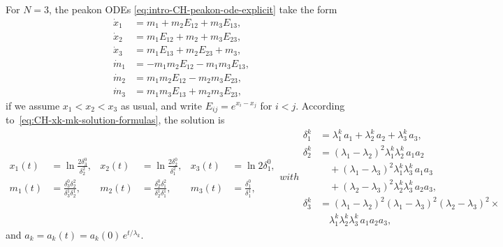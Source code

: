 \documentclass[10pt,a4paper]{article} \pdfoutput=1 
\begin{document}
\begin{example}
  \label{ex:CH-three-peakons}
  For $N=3$, the peakon ODEs \eqref{eq:intro-CH-peakon-ode-explicit} take the form
  \begin{equation}
    \begin{aligned}
      \dot x_1 &= m_1 + m_2 E_{12} + m_3 E_{13}
      , \\
      \dot x_2 &= m_1 E_{12} + m_2 + m_3 E_{23}
      , \\
      \dot x_3 &= m_1 E_{13} + m_2 E_{23} + m_3
      , \\
      \dot m_1 &= -m_1 m_2 E_{12} - m_1 m_3 E_{13}
      , \\
      \dot m_2 &= m_1 m_2 E_{12} - m_2 m_3 E_{23}
      , \\
      \dot m_3 &= m_1 m_3 E_{13} + m_2 m_3 E_{23}
      ,
    \end{aligned}
  \end{equation}
  if we assume $x_1 < x_2 < x_3$ as usual,
  and write $E_{ij} = e^{x_i-x_j}$ for $i<j$.
  According to~\eqref{eq:CH-xk-mk-solution-formulas}, the solution is
  \begin{subequations} \label{eq:CH-threepeakon-x-m}
  \begin{equation}
    \begin{aligned}
      x_1(t) &= \ln\frac{2 \delta_3^0}{\delta_2^2}
      , &
      x_2(t) &= \ln\frac{2 \delta_2^0}{\delta_1^2}
      , &
      x_3(t) &= \ln 2 \delta_1^0
      , \\
      m_1(t) &= \frac{\delta_3^0 \delta_2^2}{\delta_3^1 \delta_2^1}
      , &
      m_2(t) &= \frac{\delta_2^0 \delta_1^2}{\delta_2^1 \delta_1^1}
      , &
      m_3(t) &= \frac{\delta_1^0}{\delta_1^1}
      ,
    \end{aligned}
  \end{equation}
  with
  \begin{equation}
    \begin{aligned}
      \delta_1^k &= \lambda_1^k \, a_1 + \lambda_2^k \, a_2 + \lambda_3^k \, a_3
      , \\
      \delta_2^k &=
      (\lambda_1-\lambda_2)^2 \lambda_1^k \lambda_2^k \, a_1 a_2
      \\ & \quad
      + (\lambda_1-\lambda_3)^2 \lambda_1^k \lambda_3^k \, a_1 a_3
      \\ & \quad
      + (\lambda_2-\lambda_3)^2 \lambda_2^k \lambda_3^k \, a_2 a_3
      , \\
      \delta_3^k &=
      (\lambda_1-\lambda_2)^2 (\lambda_1-\lambda_3)^2 (\lambda_2-\lambda_3)^2
      \times
      \\ & \quad
      \lambda_1^k \lambda_2^k \lambda_3^k \, a_1 a_2 a_3
      ,
    \end{aligned}
  \end{equation}
  \end{subequations}
  and $a_k = a_k(t) = a_k(0) \, e^{t/\lambda_k}$.
\end{example}
\end{document}
